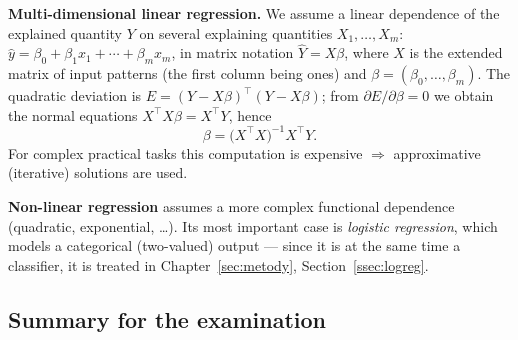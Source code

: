 \documentclass[11pt,a4paper]{article}
\theoremstyle{definition}
\begin{document}
\textbf{Multi-dimensional linear regression.} We assume a linear dependence of the explained
quantity $Y$ on several explaining quantities $X_1,\dots,X_m$:
$\hat y=\beta_0+\beta_1x_1+\cdots+\beta_mx_m$, in matrix notation $\hat Y=X\beta$, where $X$ is
the extended matrix of input patterns (the first column being ones) and
$\beta=(\beta_0,\dots,\beta_m)$. The quadratic deviation is
$E=(Y-X\beta)^{\!\top}(Y-X\beta)$; from $\partial E/\partial\beta=0$ we obtain the normal
equations $X^{\!\top}\!X\beta=X^{\!\top}Y$, hence
\[ \beta=\big(X^{\!\top}\!X\big)^{-1}X^{\!\top}Y. \]
For complex practical tasks this computation is expensive $\Rightarrow$ approximative
(iterative) solutions are used.

\textbf{Non-linear regression} assumes a more complex functional dependence (quadratic,
exponential, \dots). Its most important case is \emph{logistic regression}, which models a
categorical (two-valued) output --- since it is at the same time a classifier, it is treated in
Chapter~\ref{sec:metody}, Section~\ref{ssec:logreg}.

\subsection{Summary for the examination}
\end{document}
